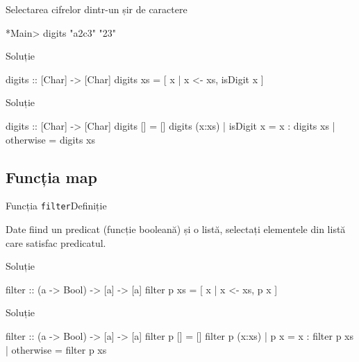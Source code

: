 \documentclass[handout,xcolor=pdftex,romanian,colorlinks]{beamer}
\begin{document}
\begin{frame}[fragile]{Selectarea cifrelor dintr-un șir de caractere}
\begin{block}{}
\begin{asciihs}
*Main> digits "a2c3"
"23"
\end{asciihs}
\end{block}
\begin{block}{Soluție }
\begin{asciihs}
digits :: [Char] -> [Char]
digits xs = [ x | x <- xs, isDigit x ]
\end{asciihs}
\end{block}
\begin{block}{Soluție }
\begin{asciihs}
digits :: [Char] -> [Char]
digits []                 = []
digits (x:xs) | isDigit x = x : digits xs
              | otherwise = digits xs
\end{asciihs}
\end{block}
\end{frame}

\subsection{Funcția map}

\begin{frame}[fragile]{Funcția \lstinline$filter$}{Definiție}
\begin{block}{}
Date fiind un predicat (funcție booleană) și o listă, selectați elementele din listă care satisfac predicatul.
\end{block}
\begin{block}{Soluție }
\begin{asciihs}
filter :: (a -> Bool) -> [a] -> [a]
filter p xs = [ x | x <- xs, p x ]
\end{asciihs}
\end{block}
\begin{block}{Soluție }
\begin{asciihs}
filter :: (a -> Bool) -> [a] -> [a]
filter p []                 = []
filter p (x:xs) | p x       = x : filter p xs
                | otherwise = filter p xs
\end{asciihs}
\end{block}
\end{frame}
\end{document}
